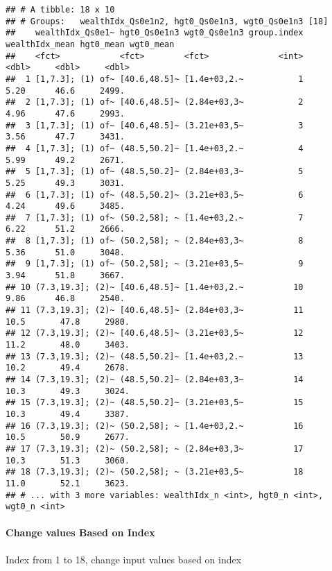 \documentclass[
]{book}
\begin{document}
\begin{verbatim}
## # A tibble: 18 x 10
## # Groups:   wealthIdx_Qs0e1n2, hgt0_Qs0e1n3, wgt0_Qs0e1n3 [18]
##    wealthIdx_Qs0e1~ hgt0_Qs0e1n3 wgt0_Qs0e1n3 group.index wealthIdx_mean hgt0_mean wgt0_mean
##    <fct>            <fct>        <fct>              <int>          <dbl>     <dbl>     <dbl>
##  1 [1,7.3]; (1) of~ [40.6,48.5]~ [1.4e+03,2.~           1           5.20      46.6     2499.
##  2 [1,7.3]; (1) of~ [40.6,48.5]~ (2.84e+03,3~           2           4.96      47.6     2993.
##  3 [1,7.3]; (1) of~ [40.6,48.5]~ (3.21e+03,5~           3           3.56      47.7     3431.
##  4 [1,7.3]; (1) of~ (48.5,50.2]~ [1.4e+03,2.~           4           5.99      49.2     2671.
##  5 [1,7.3]; (1) of~ (48.5,50.2]~ (2.84e+03,3~           5           5.25      49.3     3031.
##  6 [1,7.3]; (1) of~ (48.5,50.2]~ (3.21e+03,5~           6           4.24      49.6     3485.
##  7 [1,7.3]; (1) of~ (50.2,58]; ~ [1.4e+03,2.~           7           6.22      51.2     2666.
##  8 [1,7.3]; (1) of~ (50.2,58]; ~ (2.84e+03,3~           8           5.36      51.0     3048.
##  9 [1,7.3]; (1) of~ (50.2,58]; ~ (3.21e+03,5~           9           3.94      51.8     3667.
## 10 (7.3,19.3]; (2)~ [40.6,48.5]~ [1.4e+03,2.~          10           9.86      46.8     2540.
## 11 (7.3,19.3]; (2)~ [40.6,48.5]~ (2.84e+03,3~          11          10.5       47.8     2980.
## 12 (7.3,19.3]; (2)~ [40.6,48.5]~ (3.21e+03,5~          12          11.2       48.0     3403.
## 13 (7.3,19.3]; (2)~ (48.5,50.2]~ [1.4e+03,2.~          13          10.2       49.4     2678.
## 14 (7.3,19.3]; (2)~ (48.5,50.2]~ (2.84e+03,3~          14          10.3       49.3     3024.
## 15 (7.3,19.3]; (2)~ (48.5,50.2]~ (3.21e+03,5~          15          10.3       49.4     3387.
## 16 (7.3,19.3]; (2)~ (50.2,58]; ~ [1.4e+03,2.~          16          10.5       50.9     2677.
## 17 (7.3,19.3]; (2)~ (50.2,58]; ~ (2.84e+03,3~          17          10.3       51.3     3060.
## 18 (7.3,19.3]; (2)~ (50.2,58]; ~ (3.21e+03,5~          18          11.0       52.1     3623.
## # ... with 3 more variables: wealthIdx_n <int>, hgt0_n <int>, wgt0_n <int>
\end{verbatim}

\hypertarget{change-values-based-on-index}{%
\paragraph{Change values Based on Index}\label{change-values-based-on-index}}

Index from 1 to 18, change input values based on index
\end{document}
